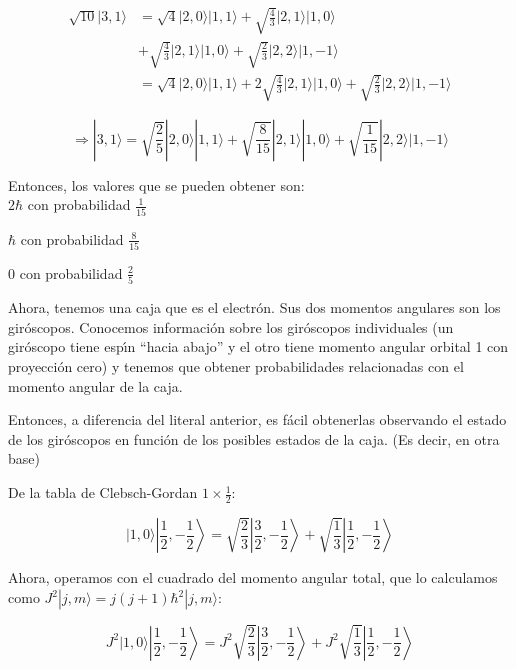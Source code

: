 \begin{solution}
\begin{parts}
  \begin{align*}
      \sqrt{10}|3,1\rangle &= \sqrt{4}|2,0\rangle |1,1\rangle +\sqrt{\frac{4}{3}}|2,1\rangle |1,0\rangle \\ 
          &+ \sqrt{\frac{4}{3}}|2,1\rangle |1,0\rangle +\sqrt{\frac{2}{3}}|2,2\rangle|1,-1\rangle\\
          &=\sqrt{4}|2,0\rangle |1,1\rangle +2\sqrt{\frac{4}{3}}|2,1\rangle |1,0\rangle +\sqrt{\frac{2}{3}}|2,2\rangle |1,-1\rangle
  \end{align*}
  
  \begin{equation*}
\Rightarrow  |3,1\rangle = \sqrt{\frac{2}{5}}|2,0\rangle |1,1\rangle + \sqrt{\frac{8}{15}}|2,1\rangle |1,0\rangle +\sqrt{\frac{1}{15}}|2,2\rangle |1,-1\rangle
  \end{equation*}
  
  Entonces, los valores que se pueden obtener son:\\
  
  \(2\hbar\) con probabilidad \(\frac{1}{15}\)
  
  \(\hbar\) { }con probabilidad \(\frac{8}{15}\)
  
  \(0\) { }con probabilidad \(\frac{2}{5}\)\\
  
  \item
   Ahora, tenemos una caja que es el electr{\' o}n. Sus dos momentos angulares son los gir{\' o}scopos. Conocemos informaci{\' o}n sobre los gir{\'
  o}scopos individuales (un gir{\' o}scopo tiene esp{\' \i}n {``}hacia abajo{''} y el otro tiene momento angular orbital 1 con proyecci{\' o}n cero)
  y tenemos que obtener probabilidades relacionadas con el momento angular de la caja.
  
  Entonces, a diferencia del literal anterior, es f{\' a}cil obtenerlas observando el estado de los gir{\' o}scopos en funci{\' o}n de los posibles
  estados de la caja. (Es decir, en otra base)
  
  De la tabla de Clebsch-Gordan \(1\times \frac{1}{2}\):
  
  \[|1,0\rangle \left|\frac{1}{2},-\frac{1}{2}\right\rangle =\sqrt{\frac{2}{3}}\left|\frac{3}{2},-\frac{1}{2}\right\rangle +\sqrt{\frac{1}{3}}\left|\frac{1}{2},-\frac{1}{2}\right\rangle\]
  
  Ahora, operamos con el cuadrado del momento angular total, que lo calculamos como \(J^2|j,m\rangle =j(j+1)\hbar ^2|j,m\rangle\):
  
  \[J^2|1,0\rangle \left|\frac{1}{2},-\frac{1}{2}\right\rangle =J^2\sqrt{\frac{2}{3}}\left|\frac{3}{2},-\frac{1}{2}\right\rangle +J^2\sqrt{\frac{1}{3}}\left|\frac{1}{2},-\frac{1}{2}\right\rangle\]
  

\end{parts}
\end{solution}
